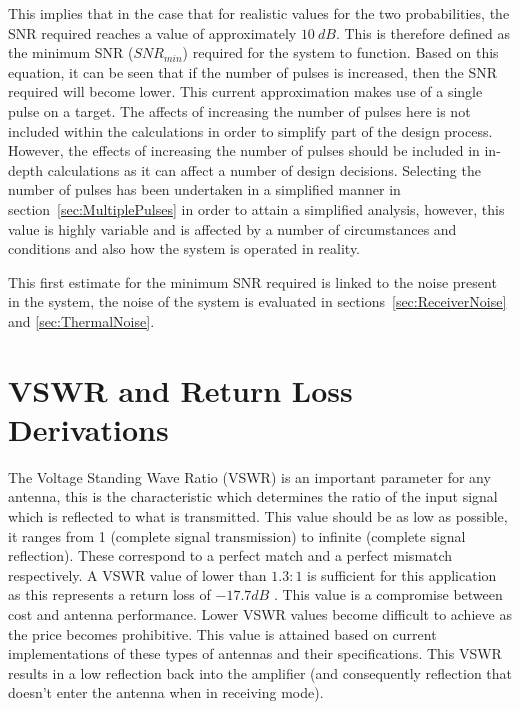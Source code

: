 \documentclass[11pt]{witseiepaper}
\begin{document}
\begin{bibunit}[witseie]
This implies that in the case that for realistic values for the two probabilities, the SNR required reaches a value of approximately $10~dB$.
This is therefore defined as the minimum SNR ($SNR_{min}$) required for the system to function.
Based on this equation, it can be seen that if the number of pulses is increased, then the SNR required will become lower. This current approximation makes use of a single pulse on a target. The affects of increasing the number of pulses here is not included within the calculations in order to simplify part of the design process. However, the effects of increasing the number of pulses should be included in in-depth calculations as it can affect a number of design decisions. Selecting the number of pulses has been undertaken in a simplified manner in section~\ref{sec:MultiplePulses} in order to attain a simplified analysis, however, this value is highly variable and is affected by a number of circumstances and conditions and also how the system is operated in reality.


This first estimate for the minimum SNR required is linked to the noise present in the system, the noise of the system is evaluated in sections~\ref{sec:ReceiverNoise} and \ref{sec:ThermalNoise}.


\section{VSWR and Return Loss Derivations} \label{sec:VSWRandReturnLossDerivations}
The Voltage Standing Wave Ratio (VSWR) is an important parameter for any antenna, this is the characteristic which determines the ratio of the input signal which is reflected to what is transmitted. This value should be as low as possible, it ranges from 1 (complete signal transmission) to infinite (complete signal reflection). These correspond to a perfect match and a perfect mismatch respectively.
A VSWR value of lower than $1.3:1$ is sufficient for this application as this represents a return loss of $-17.7 dB$ \cite{AntennaPrice1,AntennaPrice2,AntennaPrice3,AntennaPrice4}. This value is a compromise between cost and antenna performance. Lower VSWR values become difficult to achieve as the price becomes prohibitive. This value is attained based on current implementations of these types of antennas and their specifications.
This VSWR results in a low reflection back into the amplifier (and consequently reflection that doesn't enter the antenna when in receiving mode).


\end{bibunit}
\end{document}
